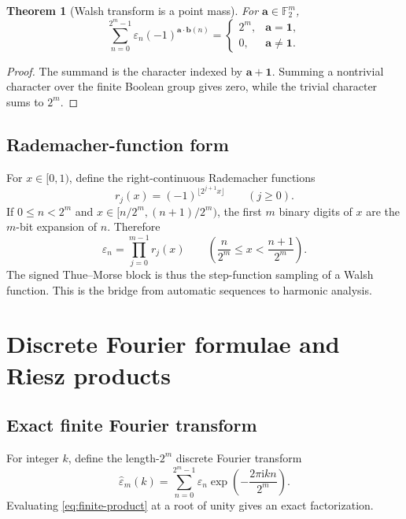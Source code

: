 \documentclass[11pt,oneside]{article}
\newtheorem{theorem}{Theorem}[section]
\theoremstyle{definition}
\theoremstyle{remark}
\newcommand{\Ftwo}{\mathbb F_2}
\newcommand{\ii}{\mathrm i}
\begin{document}
\begin{theorem}[Walsh transform is a point mass]
\label{thm:walsh-transform}
For \(\bm a\in\Ftwo^m\),
\begin{equation}
 \sum_{n=0}^{2^m-1}\varepsilon_n
 (-1)^{\bm a\cdot\bm b(n)}
 =\begin{cases}
 2^m,&\bm a=\bm1,\\
 0,&\bm a\ne\bm1.
 \end{cases}
 \label{eq:walsh-transform}
\end{equation}
\end{theorem}

\begin{proof}
The summand is the character indexed by \(\bm a+\bm1\).  Summing a nontrivial
character over the finite Boolean group gives zero, while the trivial
character sums to \(2^m\).
\end{proof}

\subsection{Rademacher-function form}

For \(x\in[0,1)\), define the right-continuous Rademacher functions
\begin{equation}
 r_j(x)=(-1)^{\lfloor2^{j+1}x\rfloor}
 \qquad(j\ge0).
 \label{eq:rademacher}
\end{equation}
If \(0\le n<2^m\) and \(x\in[n/2^m,(n+1)/2^m)\), the first \(m\) binary
digits of \(x\) are the \(m\)-bit expansion of \(n\).  Therefore
\begin{equation}
 \varepsilon_n=\prod_{j=0}^{m-1}r_j(x)
 \qquad\left(\frac{n}{2^m}\le x<\frac{n+1}{2^m}\right).
 \label{eq:rademacher-product}
\end{equation}
The signed Thue--Morse block is thus the step-function sampling of a Walsh
function.  This is the bridge from automatic sequences to harmonic analysis.

\section{Discrete Fourier formulae and Riesz products}
\label{sec:fourier}

\subsection{Exact finite Fourier transform}

For integer \(k\), define the length-\(2^m\) discrete Fourier transform
\begin{equation}
 \widehat\varepsilon_m(k)
 =\sum_{n=0}^{2^m-1}\varepsilon_n
   \exp\!\left(-\frac{2\pi\ii kn}{2^m}\right).
 \label{eq:dft-def}
\end{equation}
Evaluating \eqref{eq:finite-product} at a root of unity gives an exact
factorization.
\end{document}
